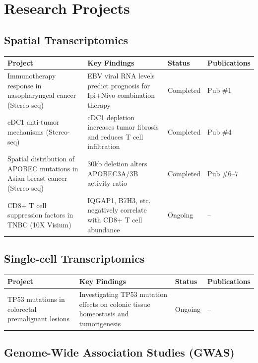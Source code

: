 \documentclass[11pt,a4paper]{article}
\begin{document}
\section*{Research Projects}

\subsection*{Spatial Transcriptomics}

\begin{tabular}{@{}p{4.2cm}p{4cm}p{1.8cm}p{2.2cm}@{}}
\toprule
\textbf{Project} & \textbf{Key Findings} & \textbf{Status} & \textbf{Publications} \\
\midrule
Immunotherapy response in nasopharyngeal cancer (Stereo-seq) & EBV viral RNA levels predict prognosis for Ipi+Nivo combination therapy & Completed & Pub \#1 \\
cDC1 anti-tumor mechanisms (Stereo-seq) & cDC1 depletion increases tumor fibrosis and reduces T cell infiltration & Completed & Pub \#4 \\
Spatial distribution of APOBEC mutations in Asian breast cancer (Stereo-seq) & 30kb deletion alters APOBEC3A/3B activity ratio & Completed & Pub \#6--7 \\
CD8+ T cell suppression factors in TNBC (10X Visium) & IQGAP1, B7H3, etc. negatively correlate with CD8+ T cell abundance & Ongoing & -- \\
\bottomrule
\end{tabular}

\subsection*{Single-cell Transcriptomics}

\begin{tabular}{@{}p{4.2cm}p{7.8cm}p{1.8cm}p{2.2cm}@{}}
\toprule
\textbf{Project} & \textbf{Key Findings} & \textbf{Status} & \textbf{Publications} \\
\midrule
TP53 mutations in colorectal premalignant lesions & Investigating TP53 mutation effects on colonic tissue homeostasis and tumorigenesis & Ongoing & -- \\
\bottomrule
\end{tabular}

\subsection*{Genome-Wide Association Studies (GWAS)}
\end{document}
